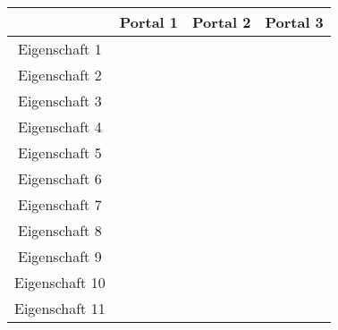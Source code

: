 \begin{landscape} \small
\begin{tabular}{|c|c|c|c|}

\hline
		& Portal 1	& Portal 2	& Portal 3	\\\hline\hline
Eigenschaft 1	& 		& 		& 		\\\hline
Eigenschaft 2	& 		& 		& 		\\\hline
Eigenschaft 3	& 		& 		& 		\\\hline
Eigenschaft 4	& 		& 		& 		\\\hline
Eigenschaft 5	& 		& 		& 		\\\hline
Eigenschaft 6	& 		& 		& 		\\\hline
Eigenschaft 7	& 		& 		& 		\\\hline
Eigenschaft 8	& 		& 		& 		\\\hline
Eigenschaft 9	& 		& 		& 		\\\hline
Eigenschaft 10	& 		& 		& 		\\\hline
Eigenschaft 11	& 		& 		& 		\\\hline

\end{tabular}
\end{landscape}
